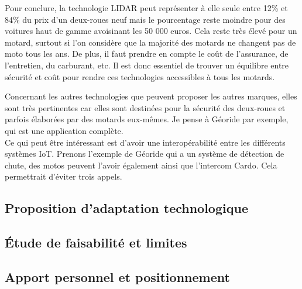 Pour conclure, la technologie LIDAR peut représenter à elle seule entre 12\% et 84\% du prix d'un deux-roues neuf mais le pourcentage reste moindre pour des voitures haut de gamme avoisinant les 50 000 euros. Cela reste très élevé pour un motard, surtout si l'on considère que la majorité des motards ne changent pas de moto tous les ans. De plus, il faut prendre en compte le coût de l'assurance, de l'entretien, du carburant, etc. Il est donc essentiel de trouver un équilibre entre sécurité et coût pour rendre ces technologies accessibles à tous les motards.

Concernant les autres technologies que peuvent proposer les autres marques, elles sont très pertinentes car elles sont destinées pour la sécurité des deux-roues et parfois élaborées par des motards eux-mêmes. Je pense à Géoride par exemple, qui est une application complète.\\
Ce qui peut être intéressant est d'avoir une interopérabilité entre les différents systèmes IoT. Prenons l'exemple de Géoride qui a un système de détection de chute, des motos peuvent l'avoir également ainsi que l'intercom Cardo. Cela permettrait d'éviter trois appels.

\subsection{ Proposition d’adaptation technologique}



\newpage
\subsection{ Étude de faisabilité et limites}


\newpage
\subsection{Apport personnel et positionnement}

